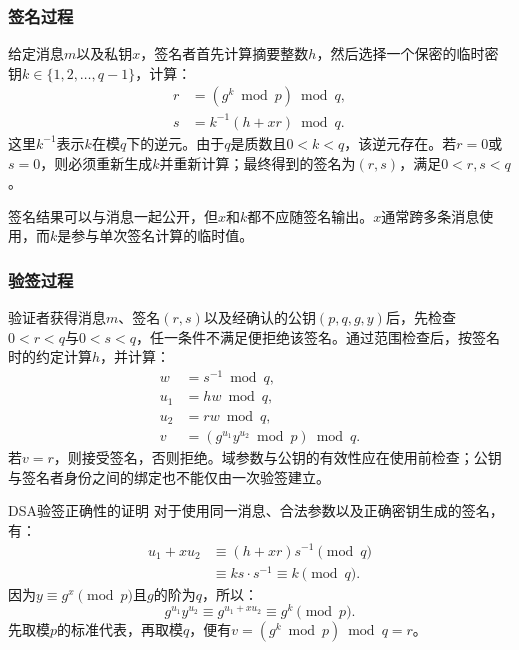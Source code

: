 \documentclass{book}
\numberwithin{equation}{subsubsection}
\begin{document}
\subsubsection{签名过程}
给定消息$m$以及私钥$x$，签名者首先计算摘要整数$h$，然后选择一个保密的临时密钥$k\in\{1,2,\ldots,q-1\}$，计算：
\begin{equation}
    \begin{aligned}
        r&=(g^k\bmod p)\bmod q,\\
        s&=k^{-1}(h+xr)\bmod q.
    \end{aligned}
    \nonumber
\end{equation}
这里$k^{-1}$表示$k$在模$q$下的逆元。由于$q$是质数且$0<k<q$，该逆元存在。若$r=0$或$s=0$，则必须重新生成$k$并重新计算；最终得到的签名为$(r,s)$，满足$0<r,s<q$。\par
签名结果可以与消息一起公开，但$x$和$k$都不应随签名输出。$x$通常跨多条消息使用，而$k$是参与单次签名计算的临时值。\par

\subsubsection{验签过程}
验证者获得消息$m$、签名$(r,s)$以及经确认的公钥$(p,q,g,y)$后，先检查$0<r<q$与$0<s<q$，任一条件不满足便拒绝该签名。通过范围检查后，按签名时的约定计算$h$，并计算：
\begin{equation}
    \begin{aligned}
        w&=s^{-1}\bmod q,\\
        u_1&=hw\bmod q,\\
        u_2&=rw\bmod q,\\
        v&=(g^{u_1}y^{u_2}\bmod p)\bmod q.
    \end{aligned}
    \nonumber
\end{equation}
若$v=r$，则接受签名，否则拒绝。域参数与公钥的有效性应在使用前检查；公钥与签名者身份之间的绑定也不能仅由一次验签建立。\par

\begin{concept}{DSA验签正确性的证明}
    对于使用同一消息、合法参数以及正确密钥生成的签名，有：
    \begin{equation}
        \begin{aligned}
            u_1+xu_2&\equiv(h+xr)s^{-1}\pmod q\\
                     &\equiv ks\cdot s^{-1}\equiv k\pmod q.
        \end{aligned}
        \nonumber
    \end{equation}
    因为$y\equiv g^x\pmod p$且$g$的阶为$q$，所以：
    \begin{equation}
        g^{u_1}y^{u_2}\equiv g^{u_1+xu_2}\equiv g^k\pmod p.
        \nonumber
    \end{equation}
    先取模$p$的标准代表，再取模$q$，便有$v=(g^k\bmod p)\bmod q=r$。\par
\end{concept}
\par
\end{document}

